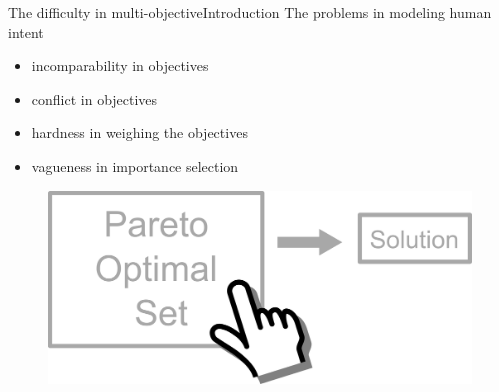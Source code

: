 \begin{frame}{The difficulty in multi-objective}{Introduction}
The problems in modeling human intent
\begin{itemize}
\item incomparability in objectives
\item conflict in objectives
\item hardness in weighing the objectives
\item vagueness in importance selection
\end{itemize}
\begin{figure}
	\centering
	\includegraphics[width=0.6\linewidth]{figure/human_interactive_moo}
	\label{fig:human_interactive_moo}
\end{figure}
\end{frame}

